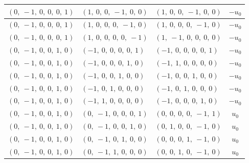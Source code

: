 \documentclass[11pt]{article}
\theoremstyle{definition}
\begin{document}
\begin{longtable}{|l|l|l|c|}
    \hline
    $\left( 0, \  -1, \  0, \  0, \  0, \  1\right)$ & $\left( 1, \  0, \  0, \  -1, \  0, \  0\right)$ & $\left( 1, \  0, \  0, \  -1, \  0, \  0\right)$ & $- u_{0}$ \\
    \hline
    $\left( 0, \  -1, \  0, \  0, \  0, \  1\right)$ & $\left( 1, \  0, \  0, \  0, \  -1, \  0\right)$ & $\left( 1, \  0, \  0, \  0, \  -1, \  0\right)$ & $- u_{0}$ \\
    \hline
    $\left( 0, \  -1, \  0, \  0, \  0, \  1\right)$ & $\left( 1, \  0, \  0, \  0, \  0, \  -1\right)$ & $\left( 1, \  -1, \  0, \  0, \  0, \  0\right)$ & $- u_{0}$ \\
    \hline
    $\left( 0, \  -1, \  0, \  0, \  1, \  0\right)$ & $\left( -1, \  0, \  0, \  0, \  0, \  1\right)$ & $\left( -1, \  0, \  0, \  0, \  0, \  1\right)$ & $- u_{0}$ \\
    \hline
    $\left( 0, \  -1, \  0, \  0, \  1, \  0\right)$ & $\left( -1, \  0, \  0, \  0, \  1, \  0\right)$ & $\left( -1, \  1, \  0, \  0, \  0, \  0\right)$ & $- u_{0}$ \\
    \hline
    $\left( 0, \  -1, \  0, \  0, \  1, \  0\right)$ & $\left( -1, \  0, \  0, \  1, \  0, \  0\right)$ & $\left( -1, \  0, \  0, \  1, \  0, \  0\right)$ & $- u_{0}$ \\
    \hline
    $\left( 0, \  -1, \  0, \  0, \  1, \  0\right)$ & $\left( -1, \  0, \  1, \  0, \  0, \  0\right)$ & $\left( -1, \  0, \  1, \  0, \  0, \  0\right)$ & $- u_{0}$ \\
    \hline
    $\left( 0, \  -1, \  0, \  0, \  1, \  0\right)$ & $\left( -1, \  1, \  0, \  0, \  0, \  0\right)$ & $\left( -1, \  0, \  0, \  0, \  1, \  0\right)$ & $- u_{0}$ \\
    \hline
    $\left( 0, \  -1, \  0, \  0, \  1, \  0\right)$ & $\left( 0, \  -1, \  0, \  0, \  0, \  1\right)$ & $\left( 0, \  0, \  0, \  0, \  -1, \  1\right)$ & $u_{0}$ \\
    \hline
    $\left( 0, \  -1, \  0, \  0, \  1, \  0\right)$ & $\left( 0, \  -1, \  0, \  0, \  1, \  0\right)$ & $\left( 0, \  1, \  0, \  0, \  -1, \  0\right)$ & $u_{0}$ \\
    \hline
    $\left( 0, \  -1, \  0, \  0, \  1, \  0\right)$ & $\left( 0, \  -1, \  0, \  1, \  0, \  0\right)$ & $\left( 0, \  0, \  0, \  1, \  -1, \  0\right)$ & $u_{0}$ \\
    \hline
    $\left( 0, \  -1, \  0, \  0, \  1, \  0\right)$ & $\left( 0, \  -1, \  1, \  0, \  0, \  0\right)$ & $\left( 0, \  0, \  1, \  0, \  -1, \  0\right)$ & $u_{0}$ \\

\end{longtable}
\end{document}

